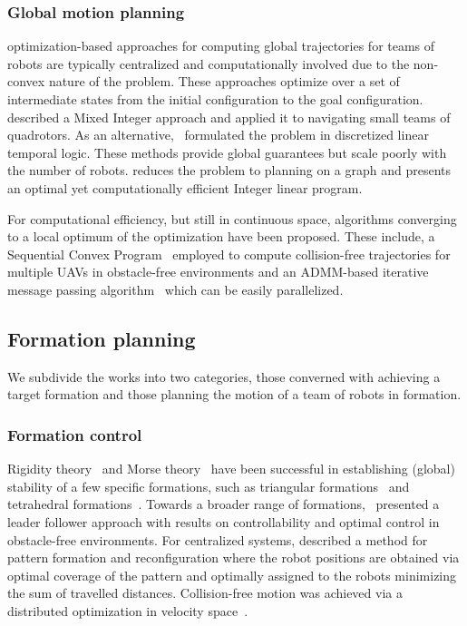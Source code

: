 \subsubsection{Global motion planning}
optimization-based approaches for computing global trajectories for teams of robots are typically centralized and computationally involved due to the non-convex nature of the problem. These approaches optimize over a set of intermediate states from the initial configuration to the goal configuration.
\cite{Mellinger:2012fi} described a Mixed Integer approach and applied it to navigating small teams of quadrotors. As an alternative,~\cite{Saha:2014vi} formulated the problem in discretized linear temporal logic. These methods provide global guarantees but scale poorly with the number of robots. \cite{Yu:2013ij} reduces the problem to planning on a graph and presents an optimal yet computationally efficient Integer linear program.

For computational efficiency, but still in continuous space, algorithms converging to a local optimum of the optimization have been proposed. These include, a Sequential Convex Program~\cite{augugliaro12} employed to compute collision-free trajectories for multiple UAVs in obstacle-free environments and an ADMM-based iterative message passing algorithm~\cite{Bento:2013td} which can be easily parallelized.

\subsection{Formation planning}

We subdivide the works into two categories, those converned with achieving a target formation and those planning the motion of a team of robots in formation.

\subsubsection{Formation control}
Rigidity theory~\cite{Eren.Belhumeur.ea:02} and Morse theory~\cite{Anderson:11} have been successful in establishing (global) stability of a few specific formations, such as triangular formations~\cite{Cao.Morse.ea:11} and tetrahedral formations~\cite{Anderson.Yu.ea:10}.
Towards a broader range of formations,~\cite{Ji:2006tr} presented a leader follower approach with results on controllability and optimal control in obstacle-free environments.
For centralized systems, \cite{alonsomora12ijrr} described a method for pattern formation and reconfiguration where the robot positions are obtained via optimal coverage of the pattern and optimally assigned to the robots minimizing the sum of travelled distances. Collision-free motion was achieved via a distributed optimization in velocity space~\cite{alonsomora10}.


